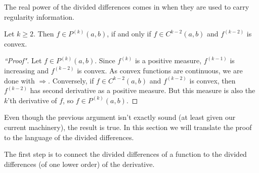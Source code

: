 The real power of the divided differences comes in when they are used to carry regularity information.

\begin{lause}\label{k-tone_smooth}
	Let $k \geq 2$. Then $f \in P^{(k)}(a, b)$, if and only if $f \in C^{k - 2}(a, b)$ and $f^{(k - 2)}$ is convex.
\end{lause}
\begin{proof}[``Proof"]
	Let $f \in P^{(k)}(a, b)$. Since $f^{(k)}$ is a positive measure, $f^{(k - 1)}$ is increasing and $f^{(k - 2)}$ is convex. As convex functions are continuous, we are done with $\Rightarrow$. Conversely, if $f \in C^{k - 2}(a, b)$ and $f^{(k - 2)}$ is convex, then $f^{(k - 2)}$ has second derivative as a positive measure. But this measure is also the $k$'th derivative of $f$, so $f \in P^{(k)}(a, b)$.
\end{proof}

Even though the previous argument isn't exactly sound (at least given our current machinery), the result is true. In this section we will translate the proof to the language of the divided differences.

The first step is to connect the divided differences of a function to the divided differences (of one lower order) of the derivative.

